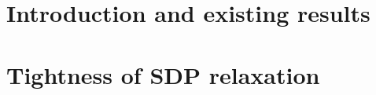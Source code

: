 \label{ch:ang_sync}
\section{Introduction and existing results}


\section{Tightness of SDP relaxation}

